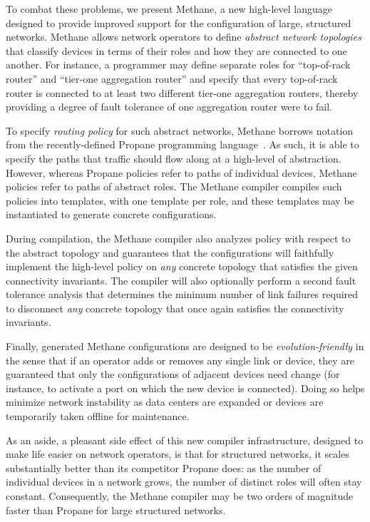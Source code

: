 \documentclass{sig-alternate-10pt}
\newcommand{\sysname}{{\small \sf Methane}\xspace}
\newcommand{\propane}{{\small \sf Propane}\xspace}
\begin{document}
To combat these problems, we present \sysname, a
new high-level language designed to
provide improved support for the configuration of large, structured networks.
\sysname allows network operators to define \emph{abstract network topologies}
that
classify devices in terms of their roles and how they are connected
to one another.  For instance, a programmer may
define separate roles for ``top-of-rack router'' and
``tier-one aggregation router'' and specify that every top-of-rack router
is connected to at least two different tier-one aggregation routers,
thereby providing a degree of fault tolerance of one aggregation router
were to fail.

To specify \emph{routing policy} for such abstract networks,
\sysname borrows notation from the recently-defined \propane
programming language~\cite{propane}.  As such, it is able to
specify the paths that traffic should flow along at a high-level of
abstraction.  However, whereas \propane policies
refer to paths of individual devices, \sysname policies
refer to paths of abstract roles.  The \sysname compiler compiles such
policies into templates, with one template per role, and these templates
may be instantiated to generate concrete configurations.

During compilation, the \sysname compiler also analyzes policy with respect to the
abstract topology and guarantees that the configurations will
faithfully implement the high-level policy on \emph{any} concrete
topology that satisfies the given connectivity invariants.  The compiler
will also optionally perform a second fault tolerance analysis that
determines the minimum number of link failures required to disconnect
\emph{any} concrete topology that once again satisfies the connectivity
invariants.

Finally, generated \sysname configurations are designed to
be \emph{evolution-friendly} in the sense that if an operator adds or
removes any single link or device, they are guaranteed that only
the configurations of adjacent devices need change (for instance, to
activate a port on which the new device is connected).  Doing so
helps minimize network instability as data centers are expanded or devices are
temporarily taken offline for maintenance.

As an aside, a pleasant side effect of this new compiler
infrastructure, designed to make life easier on network operators, is
that for structured networks, it scales substantially better than its
competitor \propane does: as the number of individual devices in a
network grows, the number of distinct roles will often stay constant.
Consequently, the \sysname compiler may be two orders of magnitude
faster than \propane for large structured networks.
\end{document}

